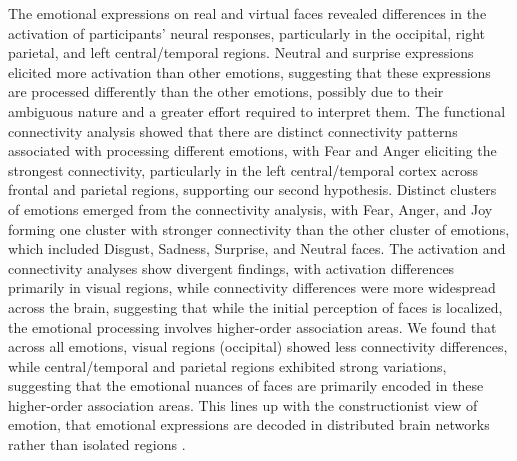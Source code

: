 The emotional expressions on real and virtual faces revealed differences in the activation of participants' neural responses, particularly in the occipital, right parietal, and left central/temporal regions.
Neutral and surprise expressions elicited more activation than other emotions, suggesting that these expressions are processed differently than the other emotions, possibly due to their ambiguous nature and a greater effort required to interpret them.
The functional connectivity analysis showed that there are distinct connectivity patterns associated with processing different emotions, with Fear and Anger eliciting the strongest connectivity, particularly in the left central/temporal cortex across frontal and parietal regions, supporting our second hypothesis.
Distinct clusters of emotions emerged from the connectivity analysis, with Fear, Anger, and Joy forming one cluster with stronger connectivity than the other cluster of emotions, which included Disgust, Sadness, Surprise, and Neutral faces.
The activation and connectivity analyses show divergent findings, with activation differences primarily in visual regions, while connectivity differences were more widespread across the brain, suggesting that while the initial perception of faces is localized, the emotional processing involves higher-order association areas. 
We found that across all emotions, visual regions (occipital) showed less connectivity differences, while central/temporal and parietal regions exhibited strong variations, suggesting that the emotional nuances of faces are primarily encoded in these higher-order association areas. 
This lines up with the constructionist view of emotion, that emotional expressions are decoded in distributed brain networks rather than isolated regions \citep{barrett_solving_2006}. 

